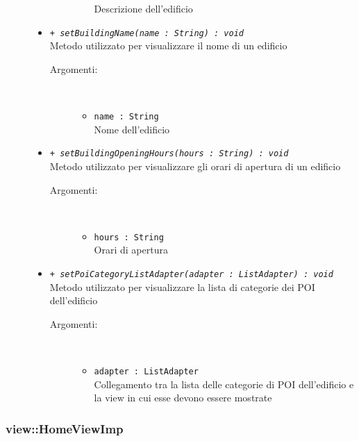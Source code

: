 \documentclass[../DefinizioneDiProdotto.tex]{subfiles}
\begin{document}
\begin{description}
\begin{itemize}
\begin{description}
\begin{itemize}
Descrizione dell'edificio\end{itemize}
\end{description}
\item \texttt{+ \textit{setBuildingName(name : String) : void}}\\
Metodo utilizzato per visualizzare il nome di un edificio
 \begin{description}
\item[Argomenti:] \
\begin{itemize}
\item \texttt{name : String}\\
Nome dell'edificio\end{itemize}
\end{description}
\item \texttt{+ \textit{setBuildingOpeningHours(hours : String) : void}}\\
Metodo utilizzato per visualizzare gli orari di apertura di un edificio
 \begin{description}
\item[Argomenti:] \
\begin{itemize}
\item \texttt{hours : String}\\
Orari di apertura\end{itemize}
\end{description}
\item \texttt{+ \textit{setPoiCategoryListAdapter(adapter : ListAdapter) : void}}\\
Metodo utilizzato per visualizzare la lista di categorie dei POI dell'edificio
 \begin{description}
\item[Argomenti:] \
\begin{itemize}
\item \texttt{adapter : ListAdapter}\\
Collegamento tra la lista delle categorie di POI dell'edificio e la view in cui esse devono essere mostrate\end{itemize}
\end{description}
\end{itemize}
\end{description}

\subsubsection{view::HomeViewImp}
\end{document}
